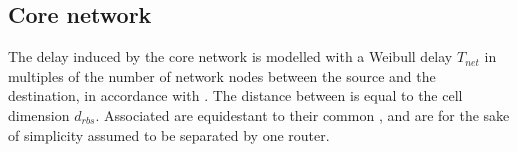 \subsection{Core network}
The delay induced by the core network is modelled with a Weibull delay $T_{net}$ in multiples of the number of network nodes between the source and the destination, in accordance with \cite{papagiannaki2003measurement}. The distance between \rbss{} is equal to the cell dimension $d_{rbs}$. Associated \rbss{} are equidestant to their common \dc{}, and are for the sake of simplicity assumed to be separated by one router.
